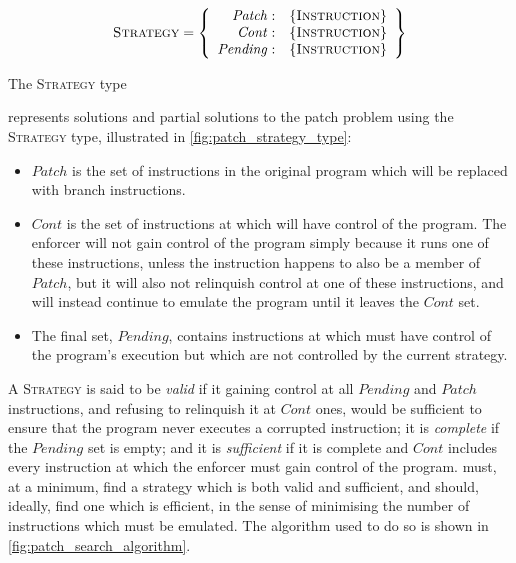 \begin{sanefig}
  \begin{displaymath}
    \textsc{Strategy} = \left\{\begin{array}{rl}
    \mathit{Patch}: & \{\textsc{Instruction}\} \\
    \mathit{Cont}: & \{\textsc{Instruction}\} \\
    \mathit{Pending}: & \{\textsc{Instruction}\}
    \end{array}\right\}
  \end{displaymath}
  \vspace{-12pt}
  \caption{The \textsc{Strategy} type}
  \label{fig:patch_strategy_type}
\end{sanefig}

{\Implementation} represents solutions and partial solutions to the
patch problem using the \textsc{Strategy} type, illustrated in
\autoref{fig:patch_strategy_type}:
\begin{itemize}
\item $\mathit{Patch}$ is the set of instructions in the original
  program which will be replaced with branch instructions.
\item $\mathit{Cont}$ is the set of instructions at which
  {\implementation} will have control of the program.  The enforcer
  will not gain control of the program simply because it runs one of
  these instructions, unless the instruction happens to also be a
  member of $\mathit{Patch}$, but it will also not relinquish control
  at one of these instructions, and will instead continue to emulate
  the program until it leaves the $\mathit{Cont}$ set.
\item The final set, $\mathit{Pending}$, contains instructions at
  which {\implementation} must have control of the program's execution
  but which are not controlled by the current strategy.
\end{itemize}
A \textsc{Strategy} is said to be \emph{valid} if it gaining control
at all $\mathit{Pending}$ and $\mathit{Patch}$ instructions, and
refusing to relinquish it at $\mathit{Cont}$ ones, would be sufficient
to ensure that the program never executes a corrupted instruction; it
is \emph{complete} if the $\mathit{Pending}$ set is empty; and it is
\emph{sufficient} if it is complete and $\mathit{Cont}$ includes every
instruction at which the enforcer must gain control of the program.
{\Implementation} must, at a minimum, find a strategy which is both
valid and sufficient, and should, ideally, find one which is
efficient, in the sense of minimising the number of instructions which
must be emulated.  The algorithm used to do so is shown in
\autoref{fig:patch_search_algorithm}.

